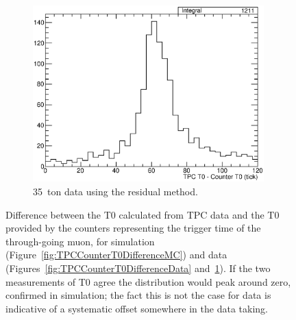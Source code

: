 \begin{figure}
\begin{subfigure}[t]{0.48\linewidth}
    \includegraphics[width=0.98\textwidth]{TPCCounterT0DifferenceDataResidual.eps}
    \caption{35~ton data using the residual method.}
    \label{fig:TPCCounterT0DifferenceDataResidual}
  \end{subfigure}
  \caption[Difference between the T0 calculated from TPC data and the T0 provided by the counters representing the trigger time of the through-going muon, for simulation and data.]{Difference between the T0 calculated from TPC data and the T0 provided by the counters representing the trigger time of the through-going muon, for simulation (Figure~\ref{fig:TPCCounterT0DifferenceMC}) and data (Figures~\ref{fig:TPCCounterT0DifferenceData} and~\ref{fig:TPCCounterT0DifferenceDataResidual}).  If the two measurements of T0 agree the distribution would peak around zero, confirmed in simulation; the fact this is not the case for data is indicative of a systematic offset somewhere in the data taking.}
  \label{fig:TPCCounterT0Difference}
\end{figure}

